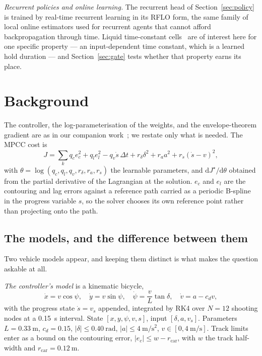 \documentclass[letterpaper, 10 pt, conference]{ieeeconf}
\begin{document}
\emph{Recurrent policies and online learning.} The recurrent head of
Section~\ref{sec:policy} is trained by real-time recurrent learning in its
RFLO form, the same family of local online estimators used for recurrent agents
that cannot afford backpropagation through time. Liquid time-constant
cells~\cite{hasani2021ltc} are of interest here for one specific property --- an
input-dependent time constant, which is a learned hold duration --- and
Section~\ref{sec:gate} tests whether that property earns its place.

\section{Background}
The controller, the log-parameterisation of the weights, and the
envelope-theorem gradient are as in our companion work~\cite{paper1}; we restate
only what is needed. The MPCC cost is
\begin{equation}
  J = \sum_k q_c e_c^2 + q_l e_l^2 - q_v \dot s\,\Delta t
      + r_\delta \delta^2 + r_a a^2 + r_{\dot s}(\dot s - v)^2,
  \label{eq:cost}
\end{equation}
with $\theta = \log(q_c, q_l, q_v, r_\delta, r_a, r_{\dot s})$ the learnable
parameters, and $\mathrm{d}J^\star/\mathrm{d}\theta$ obtained from the partial
derivative of the Lagrangian at the solution. $e_c$ and $e_l$ are the
contouring and lag errors against a reference path carried as a periodic
B-spline in the progress variable $s$, so the solver chooses its own reference
point rather than projecting onto the path.

\subsection{The models, and the difference between them}\label{sec:models}
Two vehicle models appear, and keeping them distinct is what makes the question
askable at all.

\emph{The controller's model} is a kinematic bicycle,
\begin{equation}
  \dot x = v\cos\psi,\quad \dot y = v\sin\psi,\quad
  \dot\psi = \frac{v}{L}\tan\delta,\quad \dot v = a - c_d v,
  \label{eq:bicycle}
\end{equation}
with the progress state $\dot s = v_s$ appended, integrated by RK4 over $N=12$
shooting nodes at a \SI{0.15}{\second} interval. State
$[x, y, \psi, v, s]$, input $[\delta, a, v_s]$. Parameters
$L=\SI{0.33}{\meter}$, $c_d = 0.15$, $|\delta|\le\SI{0.40}{\radian}$,
$|a|\le\SI{4}{\meter\per\second\squared}$,
$v\in[0,\SI{4}{\meter\per\second}]$. Track limits enter as a bound on the
contouring error, $|e_c| \le w - r_{\text{car}}$, with $w$ the track
half-width and $r_{\text{car}}=\SI{0.12}{\meter}$.
\end{document}
